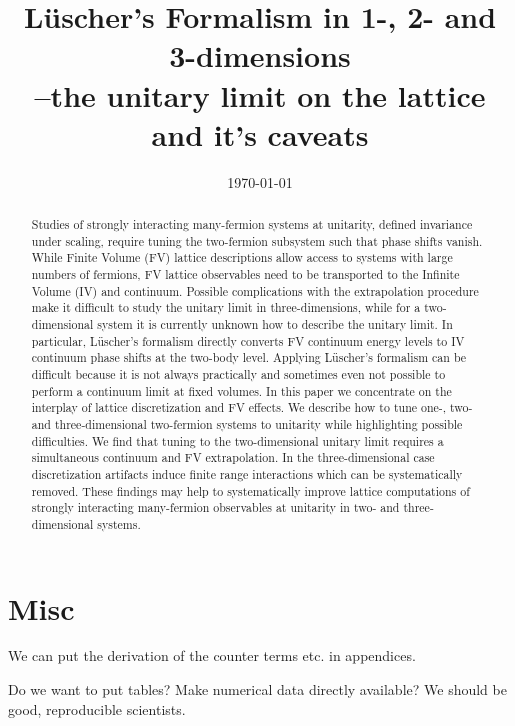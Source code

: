 \documentclass[aps,superscriptaddress,tightenlines,nofootinbib,floatfix,longbibliography,notitlepage]{revtex4-1}
\begin{document}
\title{L\"{u}scher's Formalism in 1-, 2- and 3-dimensions\\--the unitary limit on the lattice and it's caveats}





\date{\today}

\begin{abstract}
Studies of strongly interacting many-fermion systems at unitarity, defined invariance under scaling, require tuning the two-fermion subsystem such that phase shifts vanish.
While Finite Volume (FV) lattice descriptions allow access to systems with large numbers of fermions, FV lattice observables need to be transported to the Infinite Volume (IV) and continuum.
Possible complications with the extrapolation procedure make it difficult to study the unitary limit in three-dimensions, while for a two-dimensional system it is currently unknown how to describe the unitary limit.
In particular, L\"{u}scher's formalism directly converts FV continuum energy levels to IV continuum phase shifts at the two-body level.
Applying L\"{u}scher's formalism can be difficult because it is not always practically and sometimes even not possible to perform a continuum limit at fixed volumes.
In this paper we concentrate on the interplay of lattice discretization and FV effects.
We describe how to tune one-, two- and three-dimensional two-fermion systems to unitarity while highlighting possible difficulties.
We find that tuning to the two-dimensional unitary limit requires a simultaneous continuum and FV extrapolation.
In the three-dimensional case discretization artifacts induce finite range interactions which can be systematically removed.
These findings may help to systematically improve lattice computations of strongly interacting many-fermion observables at unitarity in two- and three-dimensional systems.
\end{abstract}

\maketitle





%






\appendix
\section{Misc}

We can put the derivation of the counter terms etc. in appendices.

Do we want to put tables?  Make numerical data directly available?  We should be good, reproducible scientists.









\end{document}
